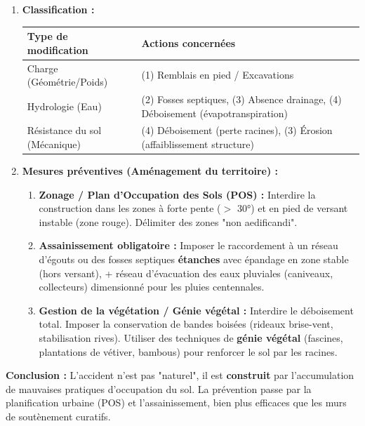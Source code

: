 \documentclass[11pt]{article}
\begin{document}
\begin{exoresolu}
\begin{enumerate}
\begin{enumerate}
                \item \textbf{Déboisement total :} Perte \textbf{renforcement racinaire} (cohesion $c'$ diminuée). Perte \textbf{évapotranspiration} (sol reste saturé plus longtemps). \textbf{Erosion de surface} (croûtes de battance, ruissellement). \textit{Mécanisme : Résistance (perte $c'$) + Hydraulique (saturation).}
            \end{enumerate}
        \item \textbf{Classification :}
            \begin{center}
                \begin{tabularx}{\linewidth}{|l|X|}\hline
                \rowcolor{popblueL} \textbf{Type de modification} & \textbf{Actions concernées} \\ \hline
                Charge (Géométrie/Poids) & (1) Remblais en pied / Excavations \\ \hline
                Hydrologie (Eau) & (2) Fosses septiques, (3) Absence drainage, (4) Déboisement (évapotranspiration) \\ \hline
                Résistance du sol (Mécanique) & (4) Déboisement (perte racines), (3) Érosion (affaiblissement structure) \\ \hline
                \end{tabularx}
            \end{center}
        \item \textbf{Mesures préventives (Aménagement du territoire) :}
            \begin{enumerate}
                \item \textbf{Zonage / Plan d'Occupation des Sols (POS) :} Interdire la construction dans les zones à forte pente ($>$ 30°) et en pied de versant instable (zone rouge). Délimiter des zones "non aedificandi".
                \item \textbf{Assainissement obligatoire :} Imposer le raccordement à un réseau d'égouts ou des fosses septiques \textbf{étanches} avec épandage en zone stable (hors versant), + réseau d'évacuation des eaux pluviales (caniveaux, collecteurs) dimensionné pour les pluies centennales.
                \item \textbf{Gestion de la végétation / Génie végétal :} Interdire le déboisement total. Imposer la conservation de bandes boisées (rideaux brise-vent, stabilisation rives). Utiliser des techniques de \textbf{génie végétal} (fascines, plantations de vétiver, bambous) pour renforcer le sol par les racines.
            \end{enumerate}
    \end{enumerate}
    \textbf{Conclusion :} L'accident n'est pas "naturel", il est \textbf{construit} par l'accumulation de mauvaises pratiques d'occupation du sol. La prévention passe par la planification urbaine (POS) et l'assainissement, bien plus efficaces que les murs de soutènement curatifs.
\end{exoresolu}
\end{document}
